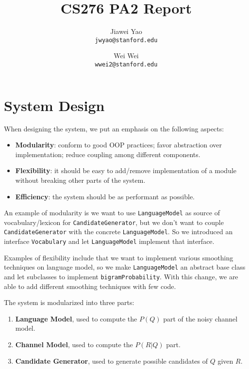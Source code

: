 \documentclass{article}
\begin{document}
\title{CS276 PA2 Report}

\author{
  Jiawei Yao\\
  \texttt{jwyao@stanford.edu}
  \and
  Wei Wei\\
  \texttt{wwei2@stanford.edu}
}

\maketitle

\section{System Design}

When designing the system, we put an emphasis on the following aspects:

\begin{itemize}
    \item \textbf{Modularity}: conform to good OOP practices; favor abstraction over implementation; reduce coupling among different components.
    \item \textbf{Flexibility}: it should be easy to add/remove implementation of a module without breaking other parts of the system.
    \item \textbf{Efficiency}: the system should be as performant as possible.
\end{itemize}

An example of modularity is we want to use \texttt{LanguageModel} as source of vocabulary/lexicon for \texttt{CandidateGenerator}, but we don't want to couple \texttt{CandidateGenerator} with the concrete \texttt{LanguageModel}. So we introduced an interface \texttt{Vocabulary} and let \texttt{LanguageModel} implement that interface.

Examples of flexibility include that we want to implement various smoothing techniques on language model, so we make \texttt{LanguageModel} an abstract base class and let subclasses to implement \texttt{bigramProbability}. With this change, we are able to add different smoothing techniques with few code.

The system is modularized into three parts:

\begin{enumerate}
    \item \textbf{Language Model}, used to compute the $P(Q)$ part of the noisy channel model.
    \item \textbf{Channel Model}, used to compute the $P(R|Q)$ part.
    \item \textbf{Candidate Generator}, used to generate possible candidates of $Q$ given $R$.
\end{enumerate}
\end{document}

